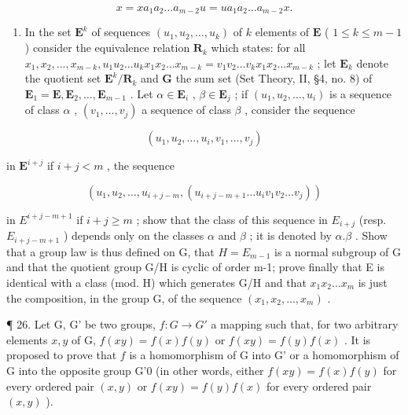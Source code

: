 \[
x = x a _ {1} a _ {2} \dots a _ {m - 2} u = u a _ {1} a _ {2} \dots a _ {m - 2} x.
\]

\begin{enumerate}
\def\labelenumi{(\alph{enumi})}
\setcounter{enumi}{2}
\tightlist
\item
  In the set \(\mathbf{E}^k\) of sequences \((u_1, u_2, \ldots, u_k)\) of \(k\) elements of \(\mathbf{E}\) ( \(1 \leqslant k \leqslant m - 1\) ) consider the equivalence relation \(\mathbf{R}_k\) which states: for all \(x_1, x_2, \ldots, x_{m-k}, u_1 u_2 \ldots u_k x_1 x_2 \ldots x_{m-k} = v_1 v_2 \ldots v_k x_1 x_2 \ldots x_{m-k}\) ; let \(\mathbf{E}_k\) denote the quotient set \(\mathbf{E}^k / \mathbf{R}_k\) and \(\mathbf{G}\) the sum set (Set Theory, II, §4, no. 8) of \(\mathbf{E}_1 = \mathbf{E}, \mathbf{E}_2, \ldots, \mathbf{E}_{m-1}\) . Let \(\alpha \in \mathbf{E}_i\) , \(\beta \in \mathbf{E}_j\) ; if \((u_1, u_2, \ldots, u_i)\) is a sequence of class \(\alpha\) , \((v_1, \ldots, v_j)\) a sequence of class \(\beta\) , consider the sequence
\end{enumerate}

\[
\left(u _ {1}, u _ {2}, \dots , u _ {i}, v _ {1}, \dots , v _ {j}\right)
\]

in \(\mathbf{E}^{i + j}\) if \(i + j < m\) , the sequence

\[
\left(u _ {1}, u _ {2}, \dots , u _ {i + j - m}, \left(u _ {i + j - m + 1} \dots u _ {i} v _ {1} v _ {2} \dots v _ {j}\right)\right)
\]

in \(E^{i+j-m+1}\) if \(i+j\geqslant m\) ; show that the class of this sequence in \(E_{i+j}\) (resp. \(E_{i+j-m+1}\) ) depends only on the classes \(\alpha\) and \(\beta\) ; it is denoted by \(\alpha.\beta\) . Show that a group law is thus defined on G, that \(H=E_{m-1}\) is a normal subgroup of G and that the quotient group G/H is cyclic of order m-1; prove finally that E is identical with a class (mod. H) which generates G/H and that \(x_{1}x_{2}\ldots x_{m}\) is just the composition, in the group G, of the sequence \((x_{1},x_{2},\ldots,x_{m})\) .

¶ 26. Let G, G' be two groups, \(f: G \to G'\) a mapping such that, for two arbitrary elements \(x, y\) of G, \(f(xy) = f(x)f(y)\) or \(f(xy) = f(y)f(x)\) . It is proposed to prove that \(f\) is a homomorphism of G into G' or a homomorphism of G into the opposite group G'0 (in other words, either \(f(xy) = f(x)f(y)\) for every ordered pair \((x, y)\) or \(f(xy) = f(y)f(x)\) for every ordered pair \((x, y)\) ).


